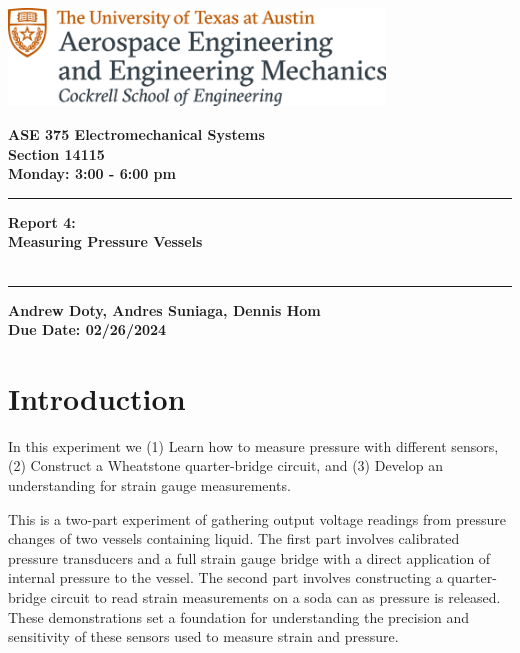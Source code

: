 \documentclass{article}
\begin{document}
\begin{titlepage}
  \centering
  \includegraphics[width=10cm]{ase-logo-formal.png}  %
  \vspace{1cm}  %
 
  \Large \textbf{ASE 375 Electromechanical Systems}\\
  \large \textbf{Section 14115}\\
  \vspace{0.5cm}
  \textbf{Monday: 3:00 - 6:00 pm}\\
 
  \vspace{1cm}
 
  \hrule
  \vspace{0.5cm}
 
  \Huge \textbf{Report 4:\\
  Measuring Pressure Vessels}\\
  \Huge \textbf{}\\
 
  \vspace{0.5cm}
  \hrule
 
  \vspace{1cm}
 
  \normalsize \textbf{Andrew Doty, Andres Suniaga, Dennis Hom}\\
  \normalsize \textbf{Due Date: 02/26/2024}
 
\end{titlepage}
\newpage

\tableofcontents
\thispagestyle{empty}
\newpage

\section{Introduction}
In this experiment we (1) Learn how to measure pressure with different sensors, (2) Construct a Wheatstone quarter-bridge circuit, and (3) Develop an understanding for strain gauge measurements. 

This is a two-part experiment of gathering output voltage readings from pressure changes of two vessels containing liquid. The first part involves calibrated pressure transducers and a full strain gauge bridge with a direct application of internal pressure to the vessel. The second part involves constructing a quarter-bridge circuit to read strain measurements on a soda can as pressure is released. These demonstrations set a foundation for understanding the precision and sensitivity of these sensors used to measure strain and pressure. 
\end{document}
